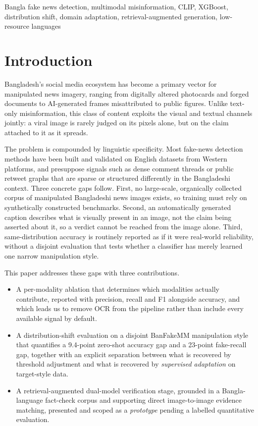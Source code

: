 \documentclass[conference,a4paper]{IEEEtran}
\begin{document}
\begin{IEEEkeywords}
Bangla fake news detection, multimodal misinformation, CLIP, XGBoost,
distribution shift, domain adaptation, retrieval-augmented generation,
low-resource languages
\end{IEEEkeywords}

\section{Introduction}

Bangladesh's social media ecosystem has become a primary vector for
manipulated news imagery, ranging from digitally altered photocards and forged
documents to AI-generated frames misattributed to public figures. Unlike
text-only misinformation, this class of content exploits the visual and
textual channels jointly: a viral image is rarely judged on its pixels alone,
but on the claim attached to it as it spreads.

The problem is compounded by linguistic specificity. Most fake-news detection
methods have been built and validated on English datasets from Western
platforms, and presuppose signals such as dense comment threads or public
retweet graphs that are sparse or structured differently in the Bangladeshi
context. Three concrete gaps follow. First, no large-scale, organically
collected corpus of manipulated Bangladeshi news images exists, so training
must rely on synthetically constructed benchmarks. Second, an automatically
generated caption describes what is visually present in an image, not the
claim being asserted about it, so a verdict cannot be reached from the image
alone. Third, same-distribution accuracy is routinely reported as if it were
real-world reliability, without a disjoint evaluation that tests whether a
classifier has merely learned one narrow manipulation style.

This paper addresses these gaps with three contributions.
\begin{itemize}
\item A per-modality ablation that determines which modalities actually
contribute, reported with precision, recall and F1 alongside accuracy, and
which leads us to remove OCR from the pipeline rather than include every
available signal by default.
\item A distribution-shift evaluation on a disjoint BanFakeMM manipulation
style that quantifies a 9.4-point zero-shot accuracy gap and a 23-point
fake-recall gap, together with an explicit separation between what is
recovered by threshold adjustment and what is recovered by \emph{supervised
adaptation} on target-style data.
\item A retrieval-augmented dual-model verification stage, grounded in a
Bangla-language fact-check corpus and supporting direct image-to-image
evidence matching, presented and scoped as a \emph{prototype} pending a
labelled quantitative evaluation.
\end{itemize}
\end{document}
